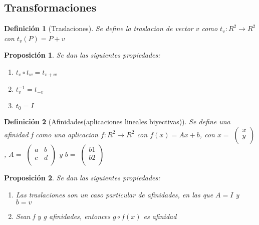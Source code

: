 \documentclass[11pt, a4paper, titlepage]{article}
\theoremstyle{theorem-style}
\newtheorem*{nprop}{Proposición}
\theoremstyle{definition-style}
\newtheorem*{ndef}{Definición}
\theoremstyle{remark-style}
\theoremstyle{example-style}
\newenvironment{nlist}
{\begin{enumerate}
\renewcommand\labelenumi{(\emph{\roman{enumi})}}}
{\end{enumerate}}
\begin{document}
\subsection{Transformaciones}

\begin{ndef}[Traslaciones]
	Se define la traslacion de vector $v$ como $t_v: R^2 \rightarrow R^2$ con $t_v(P) = P + v$
\end{ndef}

\begin{nprop}
	Se dan las siguientes propiedades:
\begin{nlist}
	\item $t_v \circ t_w = t_{v+w}$
	\item $t_{v}^{-1} = t_{-v}$
	\item $t_0 = I$
\end{nlist}
\end{nprop}

\begin{ndef}[Afinidades(aplicaciones lineales biyectivas)]
	Se define una afinidad f como una aplicacion $f:R^2 \rightarrow R^2$ con $f(x) = Ax + b$, con $x =$ $\begin{pmatrix}
	x\\
	y\\
\end{pmatrix}$, $A =$ $\begin{pmatrix}
	a & b\\
	c & d\\
\end{pmatrix}$
y $b =$ $\begin{pmatrix}
	b1\\
	b2\\
\end{pmatrix}$


\end{ndef}


\begin{nprop}
Se dan las siguientes propiedades:
\begin{nlist}
	\item Las traslaciones son un caso particular de afinidades, en las que $A = I$ y $b = v$
	\item Sean f y g afinidades, entonces $g \circ f (x)$ es afinidad
\end{nlist}
\end{nprop}

\end{document}
